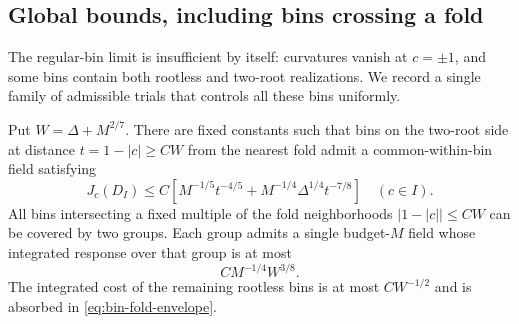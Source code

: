 \subsection{Global bounds, including bins crossing a fold}
The regular-bin limit is insufficient by itself: curvatures vanish
at $c=\pm1$, and some bins contain both rootless and two-root
realizations. We record a single family of admissible trials that
controls all these bins uniformly.

\begin{lemma}
\label{lem:bin-envelope}
Put $W=\Delta+M^{2/7}$. There are fixed constants such that bins
on the two-root side at distance $t=1-|c|\ge C W$ from the
nearest fold admit a common-within-bin field satisfying
\begin{equation}\label{eq:bin-regular-envelope}
 J_c(D_I)\le C\left[M^{-1/5}t^{-4/5}
                    +M^{-1/4}\Delta^{1/4}t^{-7/8}\right]
                         \quad(c\in I).
\end{equation}
All bins intersecting a fixed multiple of the fold neighborhoods
$|1-|c||\le C W$ can be covered by two groups. Each group admits
a single budget-$M$ field whose integrated response over that
group is at most
\begin{equation}\label{eq:bin-fold-envelope}
                  C M^{-1/4}W^{3/8}.
\end{equation}
The integrated cost of the remaining rootless bins is at most
$C W^{-1/2}$ and is absorbed in \eqref{eq:bin-fold-envelope}.
\end{lemma}
